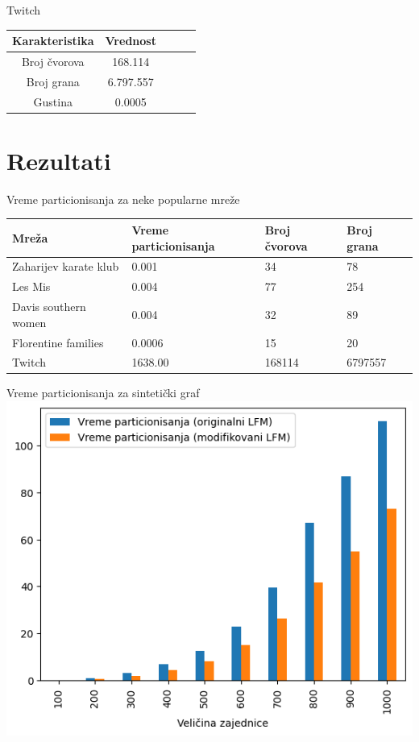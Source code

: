 \documentclass{beamer}
\begin{document}
\begin{frame}{Twitch}
    \centering
    \begin{tabular}{|c|c|c|c|c|}
        \hline
        \textbf{Karakteristika} & \textbf{Vrednost} \\
        \hline
        Broj čvorova & 168.114 \\
        Broj grana & 6.797.557 \\
        Gustina & 0.0005 \\
        \hline
    \end{tabular}
\end{frame}

\section{Rezultati}
\begin{frame}{Vreme particionisanja za neke popularne mreže}
    \centering
    \begin{table}
        \label{tab:4.2}
        \begin{tabular}{p{1in}p{0.5in}p{0.5in}p{0.5in}}
        Mreža & Vreme particionisanja & Broj čvorova & Broj grana \\
        \hline
        Zaharijev karate klub & 0.001 & 34 & 78 \\
        Les Mis & 0.004 & 77 & 254 \\
        Davis southern women & 0.004 & 32 & 89 \\
        Florentine families & 0.0006 & 15 & 20 \\
        Twitch  & 1638.00 & 168114 & 6797557 \\
    \end{tabular}
\end{table}
\end{frame}
    
\begin{frame}{Vreme particionisanja za sintetički graf}
    \centering
    \includegraphics[height=0.8\textheight]{csv/4.3.png}
\end{frame}
\end{document}
